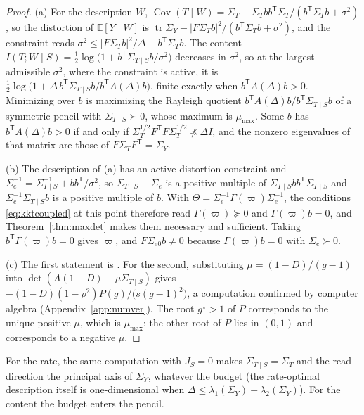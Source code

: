 \documentclass[11pt,onecolumn]{IEEEtran}
\newcommand{\E}{\mathbb{E}}
\newcommand{\tr}{\operatorname{tr}}
\newcommand{\Cov}{\operatorname{Cov}}
\begin{document}
\begin{proof}
(a) For the description $W$,
$\Cov(T\mid W)=\Sigma_T-\Sigma_Tbb^{\mathsf T}\Sigma_T/(b^{\mathsf T}\Sigma_Tb+\sigma^2)$,
so the distortion of $\E[Y\mid W]$ is
$\tr\Sigma_Y-|F\Sigma_Tb|^2/(b^{\mathsf T}\Sigma_Tb+\sigma^2)$, and the
constraint reads $\sigma^2\le|F\Sigma_Tb|^2/\Delta-b^{\mathsf T}\Sigma_Tb$.
The content
$I(T;W\mid S)=\tfrac12\log\bigl(1+b^{\mathsf T}\Sigma_{T\mid S}b/\sigma^2\bigr)$
decreases in $\sigma^2$, so at the largest admissible $\sigma^2$, where the
constraint is active, it is
$\tfrac12\log\bigl(1+\Delta\,b^{\mathsf T}\Sigma_{T\mid S}b/b^{\mathsf T}A(\Delta)b\bigr)$,
finite exactly when $b^{\mathsf T}A(\Delta)b>0$. Minimizing over $b$ is
maximizing the Rayleigh quotient
$b^{\mathsf T}A(\Delta)b/b^{\mathsf T}\Sigma_{T\mid S}b$ of a symmetric
pencil with $\Sigma_{T\mid S}\succ0$, whose maximum is $\mu_{\max}$. Some
$b$ has $b^{\mathsf T}A(\Delta)b>0$ if and only if
$\Sigma_T^{1/2}F^{\mathsf T}F\Sigma_T^{1/2}\not\preceq\Delta I$, and the
nonzero eigenvalues of that matrix are those of
$F\Sigma_TF^{\mathsf T}=\Sigma_Y$.

(b) The description of (a) has an active distortion constraint and
$\Sigma_e^{-1}=\Sigma_{T\mid S}^{-1}+bb^{\mathsf T}/\sigma^2$, so
$\Sigma_{T\mid S}-\Sigma_e$ is a positive multiple of
$\Sigma_{T\mid S}bb^{\mathsf T}\Sigma_{T\mid S}$ and
$\Sigma_e^{-1}\Sigma_{T\mid S}b$ is a positive multiple of $b$. With
$\Theta=\Sigma_e^{-1}\Gamma(\varpi)\Sigma_e^{-1}$, the conditions
\eqref{eq:kktcoupled} at this point therefore read $\Gamma(\varpi)\succeq0$
and $\Gamma(\varpi)b=0$, and Theorem~\ref{thm:maxdet} makes them necessary
and sufficient. Taking $b^{\mathsf T}\Gamma(\varpi)b=0$ gives $\varpi$, and
$F\Sigma_{e0}b\ne0$ because $\Gamma(\varpi)b=0$ with $\Sigma_e\succ0$.

(c) The first statement is \cite[Proposition~24]{bond2026tit}. For the
second, substituting $\mu=(1-D)/(g-1)$ into
$\det(A(1-D)-\mu\Sigma_{T\mid S})$ gives
$-(1-D)(1-\rho^2)P(g)/\bigl(s(g-1)^2\bigr)$, a computation confirmed by
computer algebra (Appendix~\ref{app:numver}). The root $g^\star>1$ of $P$
corresponds to the unique positive $\mu$, which is $\mu_{\max}$; the other
root of $P$ lies in $(0,1)$ and corresponds to a negative $\mu$.
\end{proof}

For the rate, the same computation with $J_S=0$ makes
$\Sigma_{T\mid S}=\Sigma_T$ and the read direction the principal axis of
$\Sigma_Y$, whatever the budget (the rate-optimal description itself is
one-dimensional when $\Delta\le\lambda_1(\Sigma_Y)-\lambda_2(\Sigma_Y)$). For the content the budget enters the
pencil.
\end{document}
